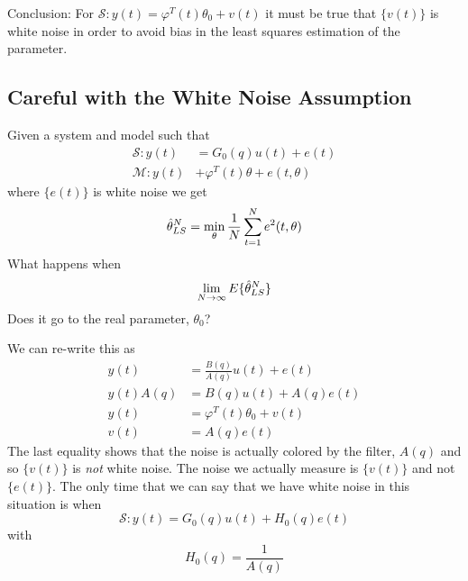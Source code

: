 Conclusion: For $\mathcal{S}: y (t) = \varphi^T (t)\theta_0 + v (t)$ it must be true that $\{v (t)\}$ is white noise in order to avoid bias in the least squares estimation of the parameter.

\subsection{Careful with the White Noise Assumption}
\label{sec:carefulwhitenoise}
Given a system and model such that
\begin{align*}
\mathcal{S}: y(t) &= G_0(q)u(t) + e(t) \\
\mathcal{M}: y(t) &+ \varphi^T(t)\theta + e(t,\theta)
\end{align*}
where $\{e(t)\}$ is white noise we get
$$\hat{\theta}_{LS}^N = \min_\theta \frac{1}{N}\sum_{t=1}^N e^2(t,\theta)$$
What happens when
$$\lim_{N\to\infty} E\{\hat{\theta}_{LS}^N\}$$
Does it go to the real parameter, $\theta_0$?

We can re-write this as
\begin{align*}
y(t) &= \frac{B(q)}{A(q)}u(t) + e(t) \\
y(t)A(q) &= B(q)u(t) + A(q)e(t) \\
y(t) &= \varphi^T(t)\theta_0 + v(t) \\
v(t) &= A(q)e(t)
\end{align*}
The last equality shows that the noise is actually colored by the filter, $A(q)$ and so $\{v(t)\}$ is \textit{not} white noise.
The noise we actually measure is $\{v(t)\}$ and not $\{e(t)\}$.
The only time that we can say that we have white noise in this situation is when
$$\mathcal{S}: y(t) = G_0(q)u(t) + H_0(q)e(t)$$
with
$$H_0(q) = \frac{1}{A(q)}$$
